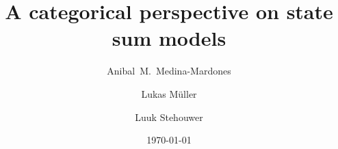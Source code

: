 \documentclass{amsart}
\title{A categorical perspective on state sum models}
\author[Medina-Mardones]{Anibal~M.~Medina-Mardones}
\author[Müller]{Lukas Müller}
\author[Stehouwer]{Luuk Stehouwer}
\date{\today}
\begin{document}
	
	\maketitle
	
	
 	
   	
	
	\sloppy
	\printbibliography
	\todos
\end{document}
